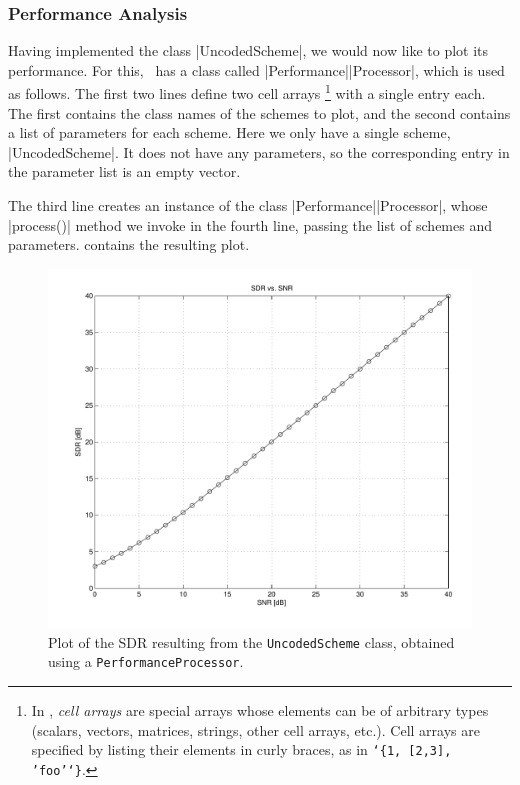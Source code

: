 \subsubsection{Performance Analysis}

Having implemented the class |UncodedScheme|, we would now like to plot its
performance. For this, \jscsim\ has a class called |Performance|\-|Processor|,
which is used as follows.
The first two lines define two cell arrays%
\footnote{In \matlab, \emph{cell arrays} are special arrays whose elements can
be of arbitrary types (scalars, vectors, matrices, strings, other cell
arrays, etc.). Cell arrays are specified by listing their elements in curly
braces, as in \texttt{\char`\{1, [2,3], 'foo'\char`\}}.}
with a single entry each.
The first contains the class names of the schemes to plot, and
the second contains a list of parameters for each scheme. Here we only have a
single scheme, |UncodedScheme|. It does not have any parameters, so the
corresponding entry in the parameter list is an empty vector. 

The third line creates an instance of the class |Performance|\-|Processor|,
whose |process()| method we invoke in the fourth line, passing the list of
schemes and parameters.  contains the resulting plot.

\begin{figure}
  \begin{center}
    \includegraphics[width=\textwidth]{figures/matlab/ex_uncoded.pdf}
  \end{center}
  \caption{Plot of the SDR resulting from the \texttt{UncodedScheme} class,
  obtained using a \texttt{PerformanceProcessor}.}
  \label{fig:uncoded}
\end{figure}

